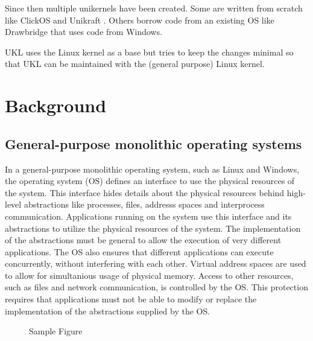 \documentclass[10pt,twocolumn,a4paper]{article}
\begin{document}
  Since then multiple unikernels have been created. Some are written from scratch like
  ClickOS \cite{martins2014} and Unikraft \cite{kuenzer21}.
  Others borrow code from an existing OS like Drawbridge \cite{porter11} 
  that uses code from Windows.

  UKL uses the Linux kernel as a base but tries to keep the changes minimal
  so that UKL can be maintained with the (general purpose) Linux kernel.
  

\section{Background}\label{sec:background}
  \subsection{General-purpose monolithic operating systems}
    In a general-purpose monolithic operating system, such as Linux and Windows,
    the operating system (OS) defines an interface to use the physical resources
    of the system. 
    This interface hides details about the physical resources behind
    high-level abstractions like processes, files, addresss spaces 
    and interprocess communication.
    Applications running on the system use this interface and its abstractions
    to utilize the physical resources of the system.
    The implementation of the abstractions must be general to allow the execution 
    of very different applications.
    The OS also ensures that different applications can execute concurrently, 
    without interfering with each other. 
    Virtual address spaces are used to allow for simultanious usage of physical memory.
    Access to other resources, such as files and network communication, is controlled
    by the OS.
    This protection requires that applications must not be able
    to modify or replace the implementation of the abstractions supplied by the OS.




\begin{figure}[htbp]
  \centering
  \caption{Sample Figure}
  \label{fig:sample}
\end{figure}
\end{document}
